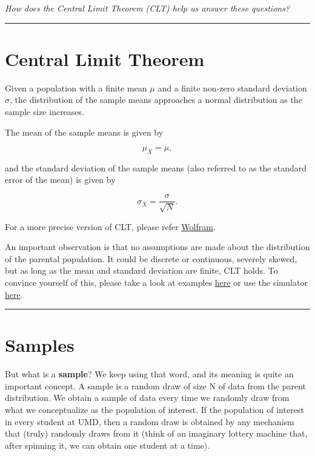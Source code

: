 \documentclass[]{book}
\begin{document}
\emph{How does the Central Limit Theorem (CLT) help us answer these
questions?}

\begin{center}\rule{0.5\linewidth}{\linethickness}\end{center}

\section{Central Limit Theorem}\label{central-limit-theorem}

Given a population with a finite mean \(\mu\) and a finite non-zero
standard deviation \(\sigma\), the distribution of the sample means
approaches a normal distribution as the sample size increases.

The mean of the sample means is given by

\[\mu_{\bar{X}} = \mu,\]

and the standard deviation of the sample means (also referred to as the
standard error of the mean) is given by

\[\sigma_{\bar{X}} = \frac{\sigma}{\sqrt{N}}.\]

For a more precise version of CLT, please refer
\href{http://mathworld.wolfram.com/CentralLimitTheorem.html}{Wolfram}.

An important observation is that no assumptions are made about the
distribution of the parental population. It could be discrete or
continuous, severely skewed, but as long as the mean and standard
deviation are finite, CLT holds. To convince yourself of this, please
take a look at examples
\href{http://sphweb.bumc.bu.edu/otlt/MPH-Modules/BS/BS704_Probability/BS704_Probability12.html}{here}
or use the simulator
\href{http://onlinestatbook.com/stat_sim/sampling_dist/index.html}{here}.

\begin{center}\rule{0.5\linewidth}{\linethickness}\end{center}

\section{Samples}\label{samples}

But what is a \textbf{sample}? We keep using that word, and its meaning
is quite an important concept. A sample is a random draw of size N of
data from the parent distribution. We obtain a sample of data every time
we randomly draw from what we conceptualize as the population of
interest. If the population of interest in every student at UMD, then a
random draw is obtained by any mechanism that (truly) randomly draws
from it (think of an imaginary lottery machine that, after spinning it,
we can obtain one student at a time).
\end{document}
